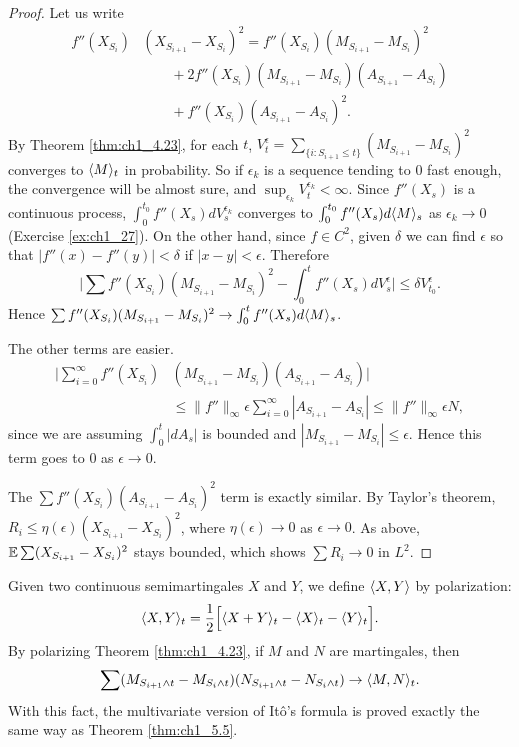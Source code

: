 \begin{proof}
Let us write
\begin{align*}
    f''(X_{S_i})&(X_{S_{i+1}} - X_{S_i})^2 = f''(X_{S_i})(M_{S_{i+1}} - M_{S_i})^2 \\
    &\qquad+ 2f''(X_{S_i})(M_{S_{i+1}} - M_{S_i})(A_{S_{i+1}} - A_{S_i}) \\
    &\qquad+ f''(X_{S_i})(A_{S_{i+1}} - A_{S_i})^2.
\end{align*}
By Theorem \ref{thm:ch1_4.23}, for each $t$, $V_t^\epsilon = \sum_{\{i:S_{i+1}\leq t\}} (M_{S_{i+1}} - M_{S_i})^2$ converges to $\langle M \rangle_t$ in probability. So if $\epsilon_k$ is a sequence tending to $0$ fast enough, the convergence will be almost sure, and $\sup_{\epsilon_k} V_t^{\epsilon_k} < \infty$. Since $f''(X_s)$ is a continuous process, $\int_0^{t_0} f''(X_s)dV_s^{\epsilon_k}$ converges to $\int_0^{t_0} f''(X_s)d\langle M \rangle_s$ as $\epsilon_k \to 0$ (Exercise \ref{ex:ch1_27}). On the other hand, since $f \in C^2$, given $\delta$ we can find $\epsilon$ so that $|f''(x) - f''(y)| < \delta$ if $|x-y| < \epsilon$. Therefore
\[
    \Big|\sum f''(X_{S_i})(M_{S_{i+1}} - M_{S_i})^2 - \int_0^t f''(X_s)dV_s^\epsilon\Big| \leq \delta V_{t_0}^\epsilon.
\]
Hence $\sum f''(X_{S_i})(M_{S_{i+1}} - M_{S_i})^2 \to \int_0^t f''(X_s)d\langle M \rangle_s$.

The other terms are easier.
\begin{align*}
    \Big|\sum_{i=0}^\infty f''(X_{S_i})&(M_{S_{i+1}}-M_{S_i})(A_{S_{i+1}}-A_{S_i})\Big| \\
    &\leq \|f''\|_\infty \epsilon \sum_{i=0}^\infty |A_{S_{i+1}}-A_{S_i}|\leq \|f''\|_\infty \epsilon N,
\end{align*}
since we are assuming $\int_0^t |dA_s|$ is bounded and $|M_{S_{i+1}}-M_{S_i}|\leq \epsilon$. Hence this term goes to $0$ as $\epsilon\to 0$.

The $\sum f''(X_{S_i})(A_{S_{i+1}} - A_{S_i})^2$ term is exactly similar. By Taylor's theorem, $R_i \leq \eta(\epsilon)(X_{S_{i+1}} - X_{S_i})^2$, where $\eta(\epsilon) \to 0$ as $\epsilon \to 0$. As above, $\mathbb{E} \sum(X_{S_{i+1}} - X_{S_i})^2$ stays bounded, which shows $\sum R_i \to 0$ in $L^2$.
\end{proof}

Given two continuous semimartingales $X$ and $Y$, we define $\langle X,Y \rangle$ by polarization:
\begin{equation}\label{eq:ch1_5.5}
    \langle X,Y \rangle_t = \frac{1}{2}\Big[\langle X+Y \rangle_t - \langle X \rangle_t - \langle Y \rangle_t\Big].
\end{equation}
By polarizing Theorem \ref{thm:ch1_4.23}, if $M$ and $N$ are martingales, then
\[
    \sum(M_{S_{i+1}\wedge t} - M_{S_i\wedge t})(N_{S_{i+1}\wedge t} - N_{S_i\wedge t}) \to \langle M,N \rangle_t.
\]
With this fact, the multivariate version of It\^o's formula is proved exactly the same way as Theorem \ref{thm:ch1_5.5}.

